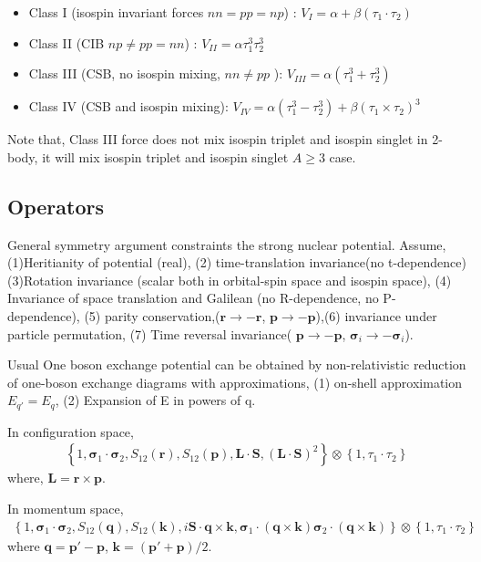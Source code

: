 \documentclass[10pt]{book}
\def\bm{\boldsymbol}
\newcommand{\bea}{\begin{eqnarray}}
\newcommand{\eea}{\end{eqnarray}}
\def\vs{{\bm \sigma}}
\def\vp{{\bm p}}
\def\vq{{\bm q}}
\def\vk{{\bm k}}
\def\vr{{\bm r}}
\begin{document}
\begin{itemize}
\item Class I (isospin invariant forces $nn=pp=np$) : $V_{I}=\alpha+\beta(\tau_1\cdot\tau_2)$

\item Class II (CIB $np\neq pp=nn$) :
$V_{II}=\alpha \tau_1^3\tau_2^3$

 \item Class III (CSB, 
                  no isospin mixing,
                  $ nn\neq pp$ ):
 $V_{III}=\alpha(\tau_1^3+\tau_2^3)$ 

\item Class IV (CSB and isospin mixing):
$V_{IV}=\alpha(\tau_1^3-\tau_2^3)+\beta(\tau_1\times\tau_2)^3$

\end{itemize}

Note that, Class III force does not mix isospin triplet and
isospin singlet in 2-body, it will mix isospin triplet and isospin singlet $A\geq 3$ case.

\subsection{Operators}
General symmetry argument constraints the strong nuclear potential.
Assume, (1)Heritianity of potential (real), (2) time-translation invariance(no t-dependence)
(3)Rotation invariance (scalar both in orbital-spin space and isospin space),
(4) Invariance of space translation and Galilean (no R-dependence, no P-dependence),
(5) parity conservation,($\vr\to -\vr$, $\vp\to -\vp$),(6) invariance under particle
permutation,  (7) Time reversal invariance(
$\vp\to -\vp$, ${\bm\sigma}_i\to -{\bm\sigma}_i$).

Usual One boson exchange potential can be obtained by non-relativistic reduction
of one-boson exchange diagrams with approximations,
(1) on-shell approximation $E_{q'}=E_q$, (2) Expansion of E in powers of q.

In configuration space,
\bea
\left\{ 1,\vs_1\cdot\vs_2, S_{12}(\vr),S_{12}(\vp),
        {\bm L}\cdot{\bm S},({\bm L}\cdot{\bm S})^2 
\right\}\otimes\left\{1,\tau_1\cdot\tau_2 \right\}
\eea
where, ${\bm L}=\vr\times\vp$.

In momentum space,
\bea
\left\{ 1,\vs_1\cdot\vs_2, S_{12}(\vq),S_{12}(\vk),
        i{\bm S}\cdot\vq\times\vk, 
         \vs_1\cdot(\vq\times\vk)\vs_2\cdot(\vq\times\vk)    
\right\}\otimes\left\{1,\tau_1\cdot\tau_2 \right\}
\eea
where $\vq=\vp'-\vp$, $\vk=(\vp'+\vp)/2$.
\end{document}
